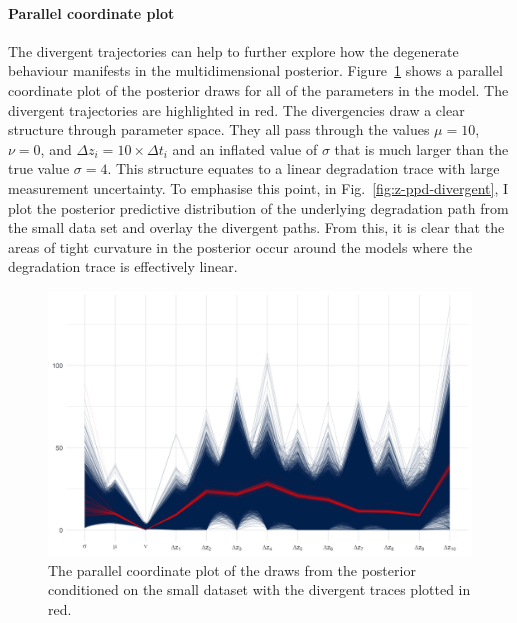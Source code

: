\paragraph*{Parallel coordinate plot}
The divergent trajectories can help to further explore how the degenerate behaviour manifests in the multidimensional posterior. Figure~\ref{fig:par-coord-single} shows a parallel coordinate plot of the posterior draws for all of the parameters in the model. The divergent trajectories are highlighted in red. The divergencies draw a clear structure through parameter space. They all pass through the values $\mu = 10$, $\nu = 0$, and $\Delta z_i = 10 \times \Delta t_i$ and an inflated value of $\sigma$ that is much larger than the true value $\sigma = 4$. This structure equates to a linear degradation trace with large measurement uncertainty. To emphasise this point, in Fig.~\ref{fig:z-ppd-divergent}, I plot the posterior predictive distribution of the underlying degradation path from the small data set and overlay the divergent paths. From this, it is clear that the areas of tight curvature in the posterior occur around the models where the degradation trace is effectively linear.

\begin{figure}
  \centering
  \includegraphics[width=0.8\columnwidth]{./figures/ch-4/parcoord.png}
  \caption{The parallel coordinate plot of the draws from the posterior conditioned on the small dataset with the divergent traces plotted in red.}
  \label{fig:par-coord-single}
\end{figure}

